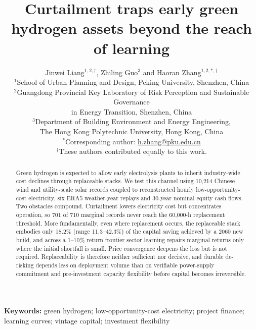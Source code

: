 \documentclass[11pt,a4paper]{article}
\begin{document}
\title{Curtailment traps early green hydrogen assets beyond the reach of learning}
\author{Jinwei Liang$^{1,2,\dagger}$, Zhiling Guo$^{3}$ and Haoran Zhang$^{1,2,*,\dagger}$\\[0.65em]
\small $^{1}$School of Urban Planning and Design, Peking University, Shenzhen, China\\
\small $^{2}$Guangdong Provincial Key Laboratory of Risk Perception and Sustainable Governance\\
\small in Energy Transition, Shenzhen, China\\
\small $^{3}$Department of Building Environment and Energy Engineering,\\
\small The Hong Kong Polytechnic University, Hong Kong, China\\[0.45em]
\small $^{*}$Corresponding author: \href{mailto:h.zhang@pku.edu.cn}{h.zhang@pku.edu.cn}\\
\small $^{\dagger}$These authors contributed equally to this work.}
\date{}

\maketitle

\begin{abstract}
Green hydrogen is expected to allow early electrolysis plants to inherit industry-wide cost declines through replaceable stacks. We test this channel using 10,214 Chinese wind and utility-scale solar records coupled to reconstructed hourly low-opportunity-cost electricity, six ERA5 weather-year replays and 30-year nominal equity cash flows. Two obstacles compound. Curtailment lowers electricity cost but concentrates operation, so 701 of 710 marginal records never reach the 60,000-h replacement threshold. More fundamentally, even where replacement occurs, the replaceable stack embodies only 18.2\% (range 11.3--42.3\%) of the capital saving achieved by a 2060 new build, and across a 1--10\% return frontier sector learning repairs marginal returns only where the initial shortfall is small. Price convergence deepens the loss but is not required. Replaceability is therefore neither sufficient nor decisive, and durable de-risking depends less on deployment volume than on verifiable power-supply commitment and pre-investment capacity flexibility before capital becomes irreversible.
\end{abstract}

\noindent\textbf{Keywords:} green hydrogen; low-opportunity-cost electricity; project finance; learning curves; vintage capital; investment flexibility
\vspace{1em}
\end{document}
